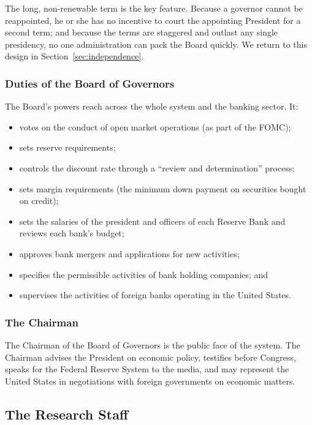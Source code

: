 The long, non-renewable term is the key feature. Because a governor cannot be reappointed, he or she has no incentive to court the appointing President for a second term; and because the terms are staggered and outlast any single presidency, no one administration can pack the Board quickly. We return to this design in Section~\ref{sec:independence}.

\subsubsection*{Duties of the Board of Governors}

The Board's powers reach across the whole system and the banking sector. It:
\begin{itemize}
    \item votes on the conduct of open market operations (as part of the FOMC);
    \item sets reserve requirements;
    \item controls the discount rate through a ``review and determination'' process;
    \item sets margin requirements (the minimum down payment on securities bought on credit);
    \item sets the salaries of the president and officers of each Reserve Bank and reviews each bank's budget;
    \item approves bank mergers and applications for new activities;
    \item specifies the permissible activities of bank holding companies; and
    \item supervises the activities of foreign banks operating in the United States.
\end{itemize}

\subsubsection*{The Chairman}

The Chairman of the Board of Governors is the public face of the system. The Chairman advises the President on economic policy, testifies before Congress, speaks for the Federal Reserve System to the media, and may represent the United States in negotiations with foreign governments on economic matters.

\subsection{The Research Staff}

